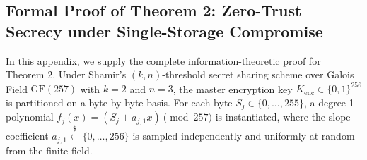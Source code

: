 \documentclass[pdflatex,sn-mathphys,Numbered]{sn-jnl}%
\theoremstyle{thmstyleone}%
\theoremstyle{thmstyletwo}%
\theoremstyle{thmstylethree}%
\begin{document}
\FloatBarrier
\begin{appendices}
\section{Formal Proof of Theorem 2: Zero-Trust Secrecy under Single-Storage Compromise}\label{secA1}
In this appendix, we supply the complete information-theoretic proof for Theorem 2. Under Shamir's $(k,n)$-threshold secret sharing scheme over Galois Field $\text{GF}(257)$ with $k=2$ and $n=3$, the master encryption key $K_{\text{enc}} \in \{0,1\}^{256}$ is partitioned on a byte-by-byte basis. For each byte $S_j \in \{0,\dots,255\}$, a degree-1 polynomial $f_j(x) = (S_j + a_{j,1} x) \pmod{257}$ is instantiated, where the slope coefficient $a_{j,1} \xleftarrow{\$} \{0,\dots,256\}$ is sampled independently and uniformly at random from the finite field.


\end{appendices}
\end{document}

